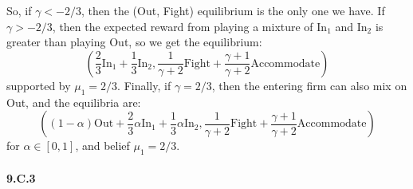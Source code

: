 \documentclass[10pt,letter]{article}
\begin{document}
So, if $\gamma < -2/3$, then the (Out, Fight) equilibrium is the only one we have. If $\gamma > -2/3$, then the expected reward from playing a mixture of In$_1$ and In$_2$ is greater than playing Out, so we get the equilibrium:
\[ \left(\frac{2}{3} \text{In}_1 + \frac{1}{3}\text{In}_2, \frac{1}{\gamma + 2} \text{Fight} + \frac{\gamma + 1}{\gamma + 2} \text{Accommodate} \right) \]
supported by $\mu_1 = 2/3$. Finally, if $\gamma = 2/3$, then the entering firm can also mix on Out, and the equilibria are:\[ \left((1-\alpha) \text{Out} + \frac{2}{3}\alpha \text{In}_1 + \frac{1}{3}\alpha \text{In}_2, \frac{1}{\gamma + 2} \text{Fight} + \frac{\gamma + 1}{\gamma + 2} \text{Accommodate} \right) \]
for $\alpha \in [0,1]$, and belief $\mu_1 = 2/3$.
\paragraph*{9.C.3}
\end{document}
